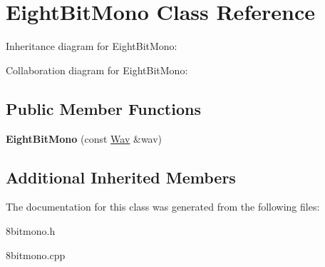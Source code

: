 \hypertarget{classEightBitMono}{}\section{Eight\+Bit\+Mono Class Reference}
\label{classEightBitMono}


Inheritance diagram for Eight\+Bit\+Mono\+:


Collaboration diagram for Eight\+Bit\+Mono\+:
\subsection*{Public Member Functions}
\begin{DoxyCompactItemize}
\item 
\mbox{\label{classEightBitMono_a08f1f216daab7c5c89070c71ef0f4af0}} 
{\bfseries Eight\+Bit\+Mono} (const \hyperlink{classWav}{Wav} \&wav)
\end{DoxyCompactItemize}
\subsection*{Additional Inherited Members}


The documentation for this class was generated from the following files\+:\begin{DoxyCompactItemize}
\item 
8bitmono.\+h\item 
8bitmono.\+cpp\end{DoxyCompactItemize}
